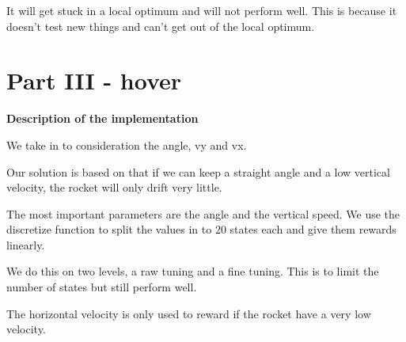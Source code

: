 \documentclass[12pt,a4paper]{article}
\begin{document}
It will get stuck in a local optimum and will not perform well. This is because it doesn't test new things and can't get out of the local optimum.

\section {Part III - hover}
\textbf{Description of the implementation}

We take in to consideration the angle, vy and vx.

Our solution is based on that if we can keep a straight angle and a low vertical velocity, the rocket will only drift very little.

The most important parameters are the angle and the vertical speed. We use the discretize function to split the values in to 20 states each and give them rewards linearly.

We do this on two levels, a raw tuning and a fine tuning. This is to limit the number of states but still perform well. 

The horizontal velocity is only used to reward if the rocket have a very low velocity. 
\end{document}
